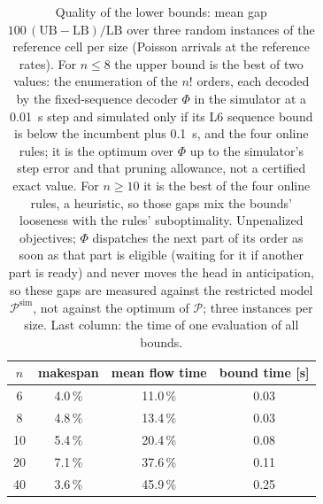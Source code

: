 \documentclass[11pt,a4paper]{article}
\theoremstyle{plain}
\theoremstyle{definition}
\theoremstyle{remark}
\newcommand{\Pb}{\mathcal{P}}
\newcommand{\Psim}{\Pb^{\mathrm{sim}}}
\begin{document}
\begin{table}[t]
\centering\small
\caption{Quality of the lower bounds: mean gap $100\,(\mathrm{UB}-\mathrm{LB})/\mathrm{LB}$
over three random instances of the reference cell per size (Poisson arrivals at the
reference rates). For $n\le8$ the upper bound is the best of two values: the
enumeration of the $n!$ orders, each decoded by the fixed-sequence decoder $\Phi$ in the
simulator at a 0.01~s step and simulated only if its L6 sequence bound is below the
incumbent plus 0.1~s, and the four online rules; it is the optimum over $\Phi$ up to the
simulator's step error and that pruning allowance, not a certified exact value. For
$n\ge10$ it is the best of the four online rules, a heuristic, so those gaps mix the
bounds' looseness with the rules' suboptimality. Unpenalized objectives; $\Phi$
dispatches the next part of its order as soon as that part is eligible (waiting for it if
another part is ready) and never moves the head in anticipation, so these gaps are
measured against the restricted model $\Psim$, not against the optimum of $\Pb$; three
instances per size. Last column: the time of one evaluation of all bounds.}
\label{tab:bounds}
\begin{tabular}{@{}cccc@{}}
\toprule
$n$ & makespan & mean flow time & bound time [s]\\
\midrule
6 & 4.0\,\% & 11.0\,\% & 0.03\\
8 & 4.8\,\% & 13.4\,\% & 0.03\\
10 & 5.4\,\% & 20.4\,\% & 0.08\\
20 & 7.1\,\% & 37.6\,\% & 0.11\\
40 & 3.6\,\% & 45.9\,\% & 0.25\\
\bottomrule
\end{tabular}
\end{table}
\end{document}
